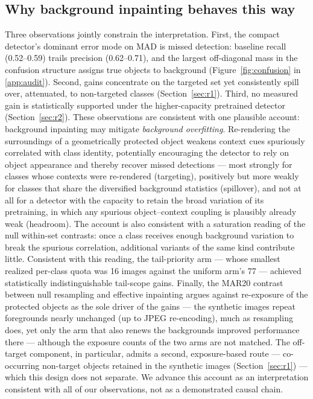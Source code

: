 \documentclass[preprint,12pt,authoryear]{elsarticle}
\begin{document}
\subsection{Why background inpainting behaves this way}\label{sec:mechanism}

Three observations jointly constrain the interpretation. First, the
compact detector's dominant error mode on MAD is missed detection:
baseline recall (0.52--0.59) trails precision (0.62--0.71), and the
largest off-diagonal mass in the confusion structure assigns true
objects to background (Figure~\ref{fig:confusion} in \ref{app:audit}). Second, gains concentrate on the targeted set yet
consistently spill over, attenuated, to non-targeted classes
(Section~\ref{sec:r1}). Third, no measured gain
is statistically supported under the higher-capacity pretrained
detector (Section~\ref{sec:r2}). These observations are consistent with one plausible account:
background inpainting may mitigate \emph{background overfitting}. Re-rendering the surroundings
of a geometrically protected object weakens context cues spuriously
correlated with class identity, potentially encouraging the detector to rely on object appearance
and thereby recover missed detections --- most strongly
for classes whose contexts were re-rendered (targeting), positively but
more weakly for classes that share the diversified background statistics
(spillover), and not at all for a detector with the capacity to retain
the broad variation of its pretraining, in which any spurious
object--context coupling is plausibly already weak (headroom). The account is also
consistent with a saturation reading of the null within-set contrasts:
once a class
receives enough background variation to break the spurious correlation,
additional variants of the same kind contribute little. Consistent with this reading, the tail-priority arm --- whose
smallest realized per-class quota was 16 images against the uniform
arm's 77 --- achieved statistically indistinguishable tail-scope
gains.
Finally, the MAR20 contrast between null resampling and effective
inpainting argues against re-exposure of the protected objects as the sole
driver of the gains --- the synthetic images repeat foregrounds nearly
unchanged (up to JPEG re-encoding), much as resampling does, yet only
the arm that also renews the backgrounds improved performance there
--- although the exposure counts of the two arms are not matched. The off-target component, in
particular, admits a second, exposure-based route --- co-occurring
non-target objects retained in the synthetic images
(Section~\ref{sec:r1}) --- which this design does not separate. We
advance this account as an interpretation consistent with all of our
observations, not as a demonstrated causal chain.
\end{document}
